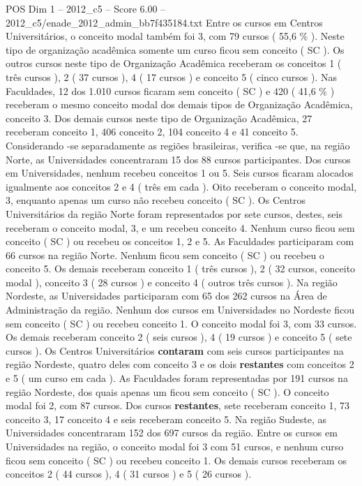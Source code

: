 \begin{textsample}{POS Dim 1 – 2012\_c5 – Score 6.00 – 2012\_c5/enade\_2012\_admin\_bb7f435184.txt}
Entre os cursos em Centros Universitários, o conceito modal também foi 3, com 79 cursos ( 55,6 \% ).
Neste tipo de organização acadêmica somente um curso ficou sem conceito ( SC ).
Os outros cursos neste tipo de Organização Acadêmica receberam os conceitos 1 ( três cursos ), 2 ( 37 cursos ), 4 ( 17 cursos ) e conceito 5 ( cinco cursos ).
Nas Faculdades, 12 dos 1.010 cursos ficaram sem conceito ( SC ) e 420 ( 41,6 \% ) receberam o mesmo conceito modal dos demais tipos de Organização Acadêmica, conceito 3.
Dos demais cursos neste tipo de Organização Acadêmica, 27 receberam conceito 1, 406 conceito 2, 104 conceito 4 e 41 conceito 5.
Considerando -se separadamente as regiões brasileiras, verifica -se que, na região Norte, as Universidades concentraram 15 dos 88 cursos participantes.
Dos cursos em Universidades, nenhum recebeu conceitos 1 ou 5.
Seis cursos ficaram alocados igualmente aos conceitos 2 e 4 ( três em cada ).
Oito receberam o conceito modal, 3, enquanto apenas um curso não recebeu conceito ( SC ).
Os Centros Universitários da região Norte foram representados por sete cursos, destes, seis receberam o conceito modal, 3, e um recebeu conceito 4.
Nenhum curso ficou sem conceito ( SC ) ou recebeu os conceitos 1, 2 e 5.
As Faculdades participaram com 66 cursos na região Norte.
Nenhum ficou sem conceito ( SC ) ou recebeu o conceito 5.
Os demais receberam conceito 1 ( três cursos ), 2 ( 32 cursos, conceito modal ), conceito 3 ( 28 cursos ) e conceito 4 ( outros três cursos ).
Na região Nordeste, as Universidades participaram com 65 dos 262 cursos na Área de Administração da região.
Nenhum dos cursos em Universidades no Nordeste ficou sem conceito ( SC ) ou recebeu conceito 1.
O conceito modal foi 3, com 33 cursos.
Os demais receberam conceito 2 ( seis cursos ), 4 ( 19 cursos ) e conceito 5 ( sete cursos ).
Os Centros Universitários \textbf{contaram} com seis cursos participantes na região Nordeste, quatro deles com conceito 3 e os dois \textbf{restantes} com conceitos 2 e 5 ( um curso em cada ).
As Faculdades foram representadas por 191 cursos na região Nordeste, dos quais apenas um ficou sem conceito ( SC ).
O conceito modal foi 2, com 87 cursos.
Dos cursos \textbf{restantes}, sete receberam conceito 1, 73 conceito 3, 17 conceito 4 e seis receberam conceito 5.
Na região Sudeste, as Universidades concentraram 152 dos 697 cursos da região.
Entre os cursos em Universidades na região, o conceito modal foi 3 com 51 cursos, e nenhum curso ficou sem conceito ( SC ) ou recebeu conceito 1.
Os demais cursos receberam os conceitos 2 ( 44 cursos ), 4 ( 31 cursos ) e 5 ( 26 cursos ).

\end{textsample}

